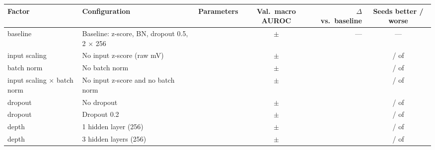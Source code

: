 \begin{tabular}{llrcrc}
\toprule
Factor & Configuration & Parameters & Val.\ macro AUROC & $\Delta$ vs.\ baseline & Seeds better / worse \\
\midrule
baseline & Baseline: z-score, BN, dropout 0.5, 2 $\times$ 256 & \denseParamsBase{} & \denseValAurocMeanBase{} $\pm$ \denseValAurocSdBase{} & --- & --- \\
\addlinespace
input scaling & No input z-score (raw mV) & \denseParamsNoNorm{} & \denseValAurocMeanNoNorm{} $\pm$ \denseValAurocSdNoNorm{} & \denseDiffMeanNoNorm{} & \denseNSeedsBetterNoNorm{} / \denseNSeedsWorseNoNorm{} of \denseNSeedsComparedNoNorm{} \\
\addlinespace
batch norm & No batch norm & \denseParamsNoBn{} & \denseValAurocMeanNoBn{} $\pm$ \denseValAurocSdNoBn{} & \denseDiffMeanNoBn{} & \denseNSeedsBetterNoBn{} / \denseNSeedsWorseNoBn{} of \denseNSeedsComparedNoBn{} \\
\addlinespace
input scaling $\times$ batch norm & No input z-score and no batch norm & \denseParamsNoNormNoBn{} & \denseValAurocMeanNoNormNoBn{} $\pm$ \denseValAurocSdNoNormNoBn{} & \denseDiffMeanNoNormNoBn{} & \denseNSeedsBetterNoNormNoBn{} / \denseNSeedsWorseNoNormNoBn{} of \denseNSeedsComparedNoNormNoBn{} \\
\addlinespace
dropout & No dropout & \denseParamsNoDropout{} & \denseValAurocMeanNoDropout{} $\pm$ \denseValAurocSdNoDropout{} & \denseDiffMeanNoDropout{} & \denseNSeedsBetterNoDropout{} / \denseNSeedsWorseNoDropout{} of \denseNSeedsComparedNoDropout{} \\
dropout & Dropout 0.2 & \denseParamsDropoutZeroTwo{} & \denseValAurocMeanDropoutZeroTwo{} $\pm$ \denseValAurocSdDropoutZeroTwo{} & \denseDiffMeanDropoutZeroTwo{} & \denseNSeedsBetterDropoutZeroTwo{} / \denseNSeedsWorseDropoutZeroTwo{} of \denseNSeedsComparedDropoutZeroTwo{} \\
\addlinespace
depth & 1 hidden layer (256) & \denseParamsDepthOne{} & \denseValAurocMeanDepthOne{} $\pm$ \denseValAurocSdDepthOne{} & \denseDiffMeanDepthOne{} & \denseNSeedsBetterDepthOne{} / \denseNSeedsWorseDepthOne{} of \denseNSeedsComparedDepthOne{} \\
depth & 3 hidden layers (256) & \denseParamsDepthThree{} & \denseValAurocMeanDepthThree{} $\pm$ \denseValAurocSdDepthThree{} & \denseDiffMeanDepthThree{} & \denseNSeedsBetterDepthThree{} / \denseNSeedsWorseDepthThree{} of \denseNSeedsComparedDepthThree{} \\

\end{tabular}
